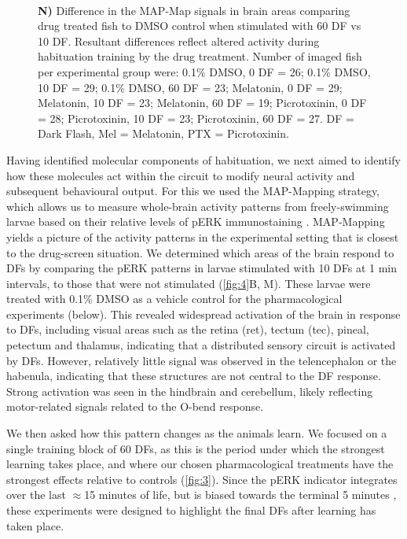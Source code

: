 \documentclass[9pt,lineno]{RandlettLab_elife}
\begin{document}
\begin{figure}
\begin{fullwidth}
\begin{center}
{\\ \textbf{N)} Difference in the MAP-Map signals in brain areas comparing drug treated fish to DMSO control when stimulated with 60 DF vs 10 DF. Resultant differences reflect altered activity during habituation training by the drug treatment. 
Number of imaged fish per experimental group were: 0.1\% DMSO, 0 DF = 26; 0.1\% DMSO, 10 DF = 29; 0.1\% DMSO, 60 DF = 23; Melatonin, 0 DF = 29; Melatonin, 10 DF = 23; Melatonin, 60 DF = 19; Picrotoxinin, 0 DF = 28; Picrotoxinin, 10 DF = 23; Picrotoxinin, 60 DF = 27.
DF = Dark Flash, Mel = Melatonin, PTX = Picrotoxinin. }
\label{fig:4}
\end{center}
\end{fullwidth}
\end{figure}

Having identified molecular components of habituation, we next aimed to identify how these molecules act within the circuit to modify neural activity and subsequent behavioural output. For this we used the MAP-Mapping strategy, which allows us to measure whole-brain activity patterns from freely-swimming larvae based on their relative levels of pERK immunostaining \cite{Randlett2015-hy}. MAP-Mapping yields a picture of the activity patterns in the experimental setting that is closest to the drug-screen situation. We determined which areas of the brain respond to DFs by comparing the pERK patterns in larvae stimulated with 10 DFs at 1 min intervals, to those that were not stimulated (\autoref{fig:4}B, M). These larvae were treated with 0.1\% DMSO as a vehicle control for the pharmacological experiments (below). This revealed widespread activation of the brain in response to DFs, including visual areas such as the retina (ret), tectum (tec), pineal, petectum and thalamus, indicating that a distributed sensory circuit is activated by DFs. However, relatively little signal was observed in the telencephalon or the habenula, indicating that these structures are not central to the DF response. Strong activation was seen in the hindbrain and cerebellum, likely reflecting motor-related signals related to the O-bend response. 

We then asked how this pattern changes as the animals learn. We focused on a single training block of 60 DFs, as this is the period under which the strongest learning takes place, and where our chosen pharmacological treatments have the strongest effects relative to controls (\autoref{fig:3}). Since the pERK indicator integrates over the last $\approx$15 minutes of life, but is biased towards the terminal 5 minutes \cite{Randlett2015-hy}, these experiments were designed to highlight the final DFs after learning has taken place.
\end{document}
